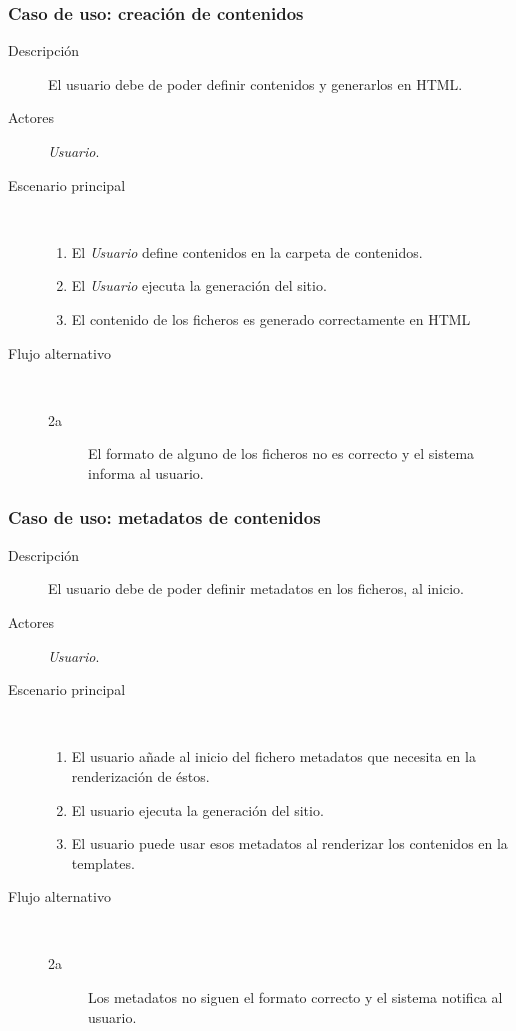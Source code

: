 \subsubsection{Caso de uso: creación de contenidos}

\begin{description}
    \item[Descripción] El usuario debe de poder definir contenidos y generarlos en HTML.
    \item[Actores] \textit{Usuario}.
    \item[Escenario principal] $\quad$
        \begin{enumerate}
            \item El \textit{Usuario} define contenidos en la carpeta de contenidos.
            \item El \textit{Usuario} ejecuta la generación del sitio.
            \item El contenido de los ficheros es generado correctamente en HTML
        \end{enumerate}
    \item[Flujo alternativo] $\quad$
        \begin{description}
            \item[2a] El formato de alguno de los ficheros no es correcto y el sistema informa al usuario.
        \end{description}
\end{description}

\subsubsection{Caso de uso: metadatos de contenidos}

\begin{description}
    \item[Descripción] El usuario debe de poder definir metadatos en los ficheros, al inicio.
    \item[Actores] \textit{Usuario}.
    \item[Escenario principal] $\quad$
        \begin{enumerate}
            \item El usuario añade al inicio del fichero metadatos que necesita en la renderización de éstos.
            \item El usuario ejecuta la generación del sitio.
            \item El usuario puede usar esos metadatos al renderizar los contenidos en la templates.
        \end{enumerate}
    \item[Flujo alternativo] $\quad$
        \begin{description}
            \item[2a] Los metadatos no siguen el formato correcto y el sistema notifica al usuario.
        \end{description}
\end{description}

